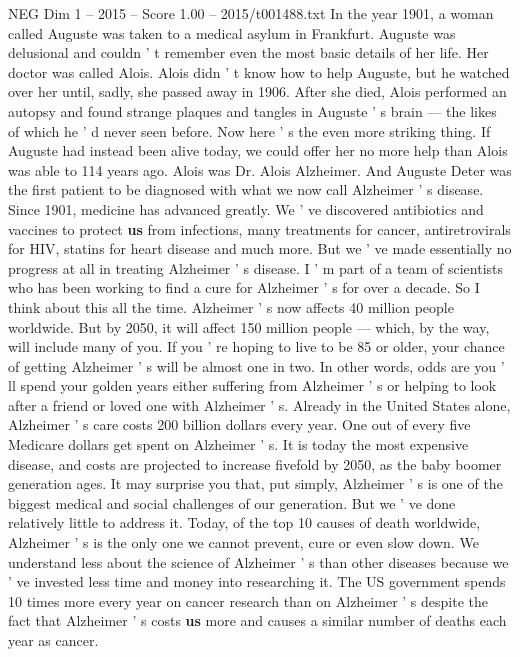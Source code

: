 \begin{textsample}{NEG Dim 1 – 2015 – Score 1.00 – 2015/t001488.txt}  \label{ex:f1_neg_041}
In the year 1901, a woman called Auguste was taken to a medical asylum in Frankfurt.
Auguste was delusional and couldn ' t remember even the most basic details of her life.
Her doctor was called Alois.
Alois didn ' t know how to help Auguste, but he watched over her until, sadly, she passed away in 1906.
After she died, Alois performed an autopsy and found strange plaques and tangles in Auguste ' s brain — the likes of which he ' d never seen before.
Now here ' s the even more striking thing.
If Auguste had instead been alive today, we could offer her no more help than Alois was able to 114 years ago.
Alois was Dr.
Alois Alzheimer.
And Auguste Deter was the first patient to be diagnosed with what we now call Alzheimer ' s disease.
Since 1901, medicine has advanced greatly.
We ' ve discovered antibiotics and vaccines to protect \textbf{us} from infections, many treatments for cancer, antiretrovirals for HIV, statins for heart disease and much more.
But we ' ve made essentially no progress at all in treating Alzheimer ' s disease.
I ' m part of a team of scientists who has been working to find a cure for Alzheimer ' s for over a decade.
So I think about this all the time.
Alzheimer ' s now affects 40 million people worldwide.
But by 2050, it will affect 150 million people — which, by the way, will include many of you.
If you ' re hoping to live to be 85 or older, your chance of getting Alzheimer ' s will be almost one in two.
In other words, odds are you ' ll spend your golden years either suffering from Alzheimer ' s or helping to look after a friend or loved one with Alzheimer ' s.
Already in the United States alone, Alzheimer ' s care costs 200 billion dollars every year.
One out of every five Medicare dollars get spent on Alzheimer ' s.
It is today the most expensive disease, and costs are projected to increase fivefold by 2050, as the baby boomer generation ages.
It may surprise you that, put simply, Alzheimer ' s is one of the biggest medical and social challenges of our generation.
But we ' ve done relatively little to address it.
Today, of the top 10 causes of death worldwide, Alzheimer ' s is the only one we cannot prevent, cure or even slow down.
We understand less about the science of Alzheimer ' s than other diseases because we ' ve invested less time and money into researching it.
The US government spends 10 times more every year on cancer research than on Alzheimer ' s despite the fact that Alzheimer ' s costs \textbf{us} more and causes a similar number of deaths each year as cancer.

\end{textsample}
